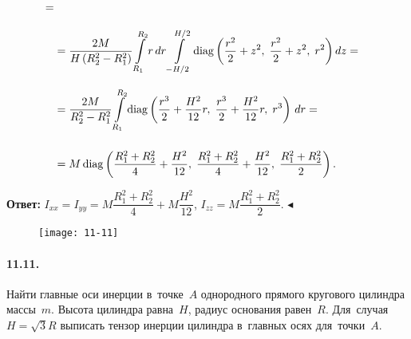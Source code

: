 \documentclass{weekly}
\begin{document}
\begin{align}
        =\\[2ex]&= \frac{2M}{H \left(R_2^2 - R_1^2\right)}
            \int\limits_{R_1}^{R_2} r \,dr
            \int\limits_{-H/2}^{H/2}
            \operatorname{diag} \left(\frac{r^2}{2}+z^2, \; \frac{r^2}{2}+z^2, \; r^2\right) dz
        =\\[2ex]&= \frac{2M}{R_2^2 - R_1^2}
            \int\limits_{R_1}^{R_2}
            \operatorname{diag} \left(\frac{r^3}{2}+\frac{H^2}{12}r, \; \frac{r^3}{2}+\frac{H^2}{12}r, \; r^3\right) \,dr
        =\\[3ex]&= M \operatorname{diag} \left(\frac{R_1^2 + R_2^2}{4} + \frac{H^2}{12}, \; \frac{R_1^2 + R_2^2}{4} + \frac{H^2}{12}, \; \frac{R_1^2 + R_2^2}{2}\right).
\end{align}

\bigskip
\textbf{Ответ:}\qquad
$I_{xx} = I_{yy} = M\dfrac{R_1^2+R_2^2}{4} + M\dfrac{H^2}{12}$, \quad
$I_{zz} = M\dfrac{R_1^2+R_2^2}{2}$.
\hfill $\blacktriangleleft$


\clearpage
\begin{wrapfigure}[7]{r}{.165\textwidth}
    \texttt{[image: 11-11]}
\end{wrapfigure}
\paragraph{11.11.} Найти главные оси инерции в~точке~$A$ однородного
прямого кругового цилиндра массы~$m$. Высота цилиндра равна~$H$,
радиус основания равен~$R$. Для~случая $H = \sqrt{3} R$ выписать
тензор инерции цилиндра в~главных осях для~точки~$A$.
\end{document}
